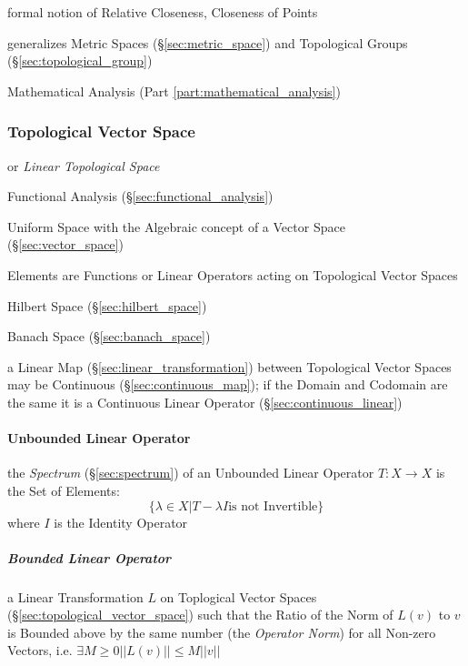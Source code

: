 formal notion of Relative Closeness, Closeness of Points

generalizes Metric Spaces (\S\ref{sec:metric_space}) and Topological
Groups (\S\ref{sec:topological_group})

Mathematical Analysis (Part \ref{part:mathematical_analysis})



\subsubsection{Topological Vector Space}\label{sec:topological_vectorspace}

or \emph{Linear Topological Space}

Functional Analysis (\S\ref{sec:functional_analysis})

Uniform Space with the Algebraic concept of a Vector Space
(\S\ref{sec:vector_space})

Elements are Functions or Linear Operators acting on Topological
Vector Spaces

Hilbert Space (\S\ref{sec:hilbert_space})

Banach Space (\S\ref{sec:banach_space})

a Linear Map (\S\ref{sec:linear_transformation}) between Topological Vector
Spaces may be Continuous (\S\ref{sec:continuous_map}); if the Domain
and Codomain are the same it is a Continuous Linear Operator
(\S\ref{sec:continuous_linear})



\paragraph{Unbounded Linear Operator}\label{sec:unbounded_linear_operator}\hfill


the \emph{Spectrum} (\S\ref{sec:spectrum}) of an Unbounded Linear Operator
$T : X \to X$ is the Set of Elements:
\[
  \{ \lambda \in X | T - \lambda I \text{is not Invertible} \}
\]
where $I$ is the Identity Operator



\subparagraph{Bounded Linear Operator}\label{sec:bounded_linear_operator}\hfill

a Linear Transformation $L$ on Toplogical Vector Spaces
(\S\ref{sec:topological_vector_space}) such that the Ratio of the Norm of $L(v)$
to $v$ is Bounded above by the same number (the \emph{Operator Norm}) for all
Non-zero Vectors, i.e. $\exists M \geq 0 ||L(v)|| \leq M||v||$

